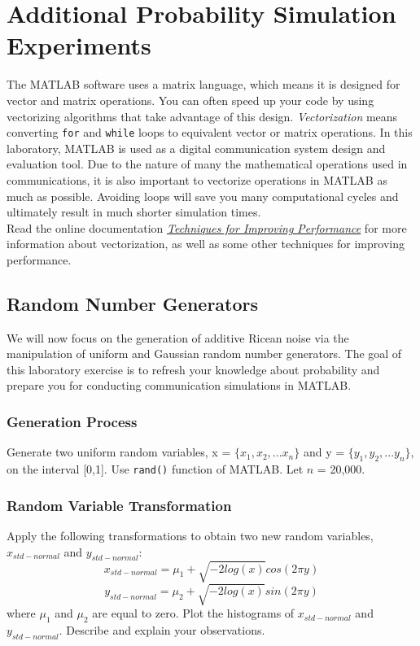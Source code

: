 \documentclass[letterpaper,12pt]{article}
\begin{document}
\newpage
\section{Additional Probability Simulation Experiments}
The MATLAB software uses a matrix language, which means it is
designed for vector and matrix operations. You can often speed up
your code by using vectorizing algorithms that take advantage of
this design. \textit{Vectorization} means converting \texttt{for}
and \texttt{while} loops to equivalent vector or matrix operations.
In this laboratory, MATLAB is used as a digital communication system
design and evaluation tool.  Due to the nature of many the
mathematical operations used in communications, it is also important
to
vectorize operations in MATLAB as much as possible.  Avoiding loops will save you many computational cycles and ultimately result in much shorter simulation times.\\

\noindent
Read the online documentation \textit{\textcolor{blue}{\href{http://www.mathworks.com/help/techdoc/matlab_prog/f8-784135.html}{Techniques for Improving Performance}}}
for more information about vectorization, as well as some other techniques for improving performance.

\subsection{Random Number Generators}
We will now focus on the generation of additive Ricean noise via the
manipulation of uniform and Gaussian random number generators. The
goal of this laboratory exercise is to refresh your knowledge about
probability and prepare you for conducting communication simulations
in MATLAB.

\subsubsection{Generation Process}
Generate two uniform random variables, x = $\{x_1, x_2, ...x_n\}$ and y = $\{y_1, y_2,...y_n\}$, on the interval [0,1].
Use \texttt{rand()} function of MATLAB. Let $n$ = 20,000.

\subsubsection{Random Variable Transformation}
Apply the following transformations to obtain two new random variables, $x_{std-normal}$ and $y_{std-normal}$:\\
\begin{equation}
x_{std-normal}=\mu_1+\sqrt{-2log(x)}cos(2 \pi y)
\end{equation}
\begin{equation}
y_{std-normal}=\mu_2+\sqrt{-2log(x)}sin(2 \pi y)
\end{equation}
\noindent
where $\mu_1$ and $\mu_2$ are equal to zero. Plot the histograms of $x_{std-normal}$ and $y_{std-normal}$. Describe and explain your observations.
\end{document}
